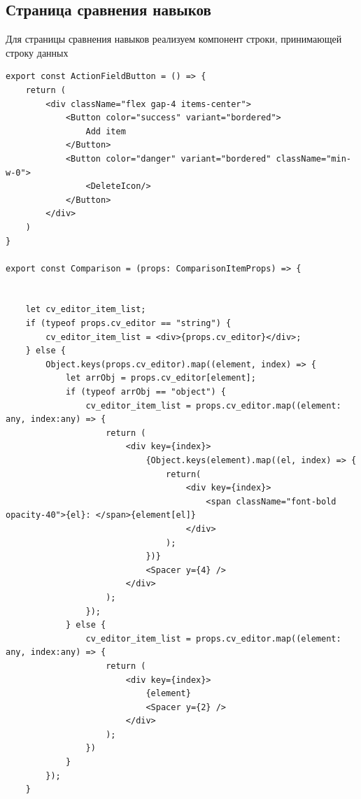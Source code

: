 \documentclass[master, och, pract]{SCWorks}
\begin{document}
\subsection{Страница сравнения навыков}
Для страницы сравнения навыков реализуем компонент строки, принимающей строку данных
\begin{verbatim}
export const ActionFieldButton = () => {
    return (
        <div className="flex gap-4 items-center">
            <Button color="success" variant="bordered">
                Add item
            </Button>    
            <Button color="danger" variant="bordered" className="min-w-0">
                <DeleteIcon/>
            </Button>
        </div>
    )
}

export const Comparison = (props: ComparisonItemProps) => {
    

    let cv_editor_item_list;
    if (typeof props.cv_editor == "string") {
        cv_editor_item_list = <div>{props.cv_editor}</div>;
    } else {
        Object.keys(props.cv_editor).map((element, index) => {
            let arrObj = props.cv_editor[element];
            if (typeof arrObj == "object") {
                cv_editor_item_list = props.cv_editor.map((element: any, index:any) => {
                    return (
                        <div key={index}>
                            {Object.keys(element).map((el, index) => {
                                return( 
                                    <div key={index}>
                                        <span className="font-bold opacity-40">{el}: </span>{element[el]}
                                    </div> 
                                );
                            })}
                            <Spacer y={4} />
                        </div>
                    );
                });  
            } else {
                cv_editor_item_list = props.cv_editor.map((element: any, index:any) => {
                    return (
                        <div key={index}>
                            {element}
                            <Spacer y={2} />
                        </div>
                    );
                })
            }
        });
    }



\end{verbatim}
\end{document}
